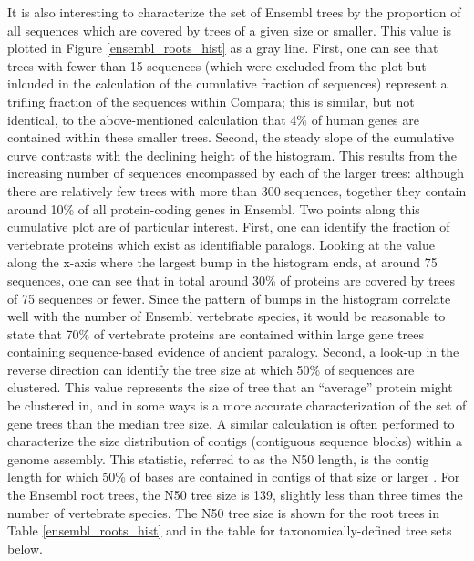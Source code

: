 It is also interesting to characterize the set of Ensembl trees by the
proportion of all sequences which are covered by trees of a given size
or smaller. This value is plotted in Figure \ref{ensembl_roots_hist}
as a gray line. First, one can see that trees with fewer than 15
sequences (which were excluded from the plot but inlcuded in the
calculation of the cumulative fraction of sequences) represent a
trifling fraction of the sequences within Compara; this is similar,
but not identical, to the above-mentioned calculation that 4\% of
human genes are contained within these smaller trees. Second, the
steady slope of the cumulative curve contrasts with the declining
height of the histogram. This results from the increasing number of
sequences encompassed by each of the larger trees: although there are
relatively few trees with more than 300 sequences, together they
contain around 10\% of all protein-coding genes in Ensembl. Two points
along this cumulative plot are of particular interest. First, one can
identify the fraction of vertebrate proteins which exist as
identifiable paralogs. Looking at the value along the x-axis where the
largest bump in the histogram ends, at around 75 sequences, one can
see that in total around 30\% of proteins are covered by trees of 75
sequences or fewer. Since the pattern of bumps in the histogram
correlate well with the number of Ensembl vertebrate species, it would
be reasonable to state that 70\% of vertebrate proteins are contained
within large gene trees containing sequence-based evidence of ancient
paralogy. Second, a look-up in the reverse direction can identify the
tree size at which 50\% of sequences are clustered. This value
represents the size of tree that an ``average'' protein might be
clustered in, and in some ways is a more accurate characterization of
the set of gene trees than the median tree size. A similar calculation
is often performed to characterize the size distribution of contigs
(contiguous sequence blocks) within a genome assembly. This statistic,
referred to as the N50 length, is the contig length for which 50\% of
bases are contained in contigs of that size or larger
\citep{TODO}. For the Ensembl root trees, the N50 tree size is 139,
slightly less than three times the number of vertebrate species. The
N50 tree size is shown for the root trees in Table
\ref{ensembl_roots_hist} and in the table for taxonomically-defined
tree sets below.


